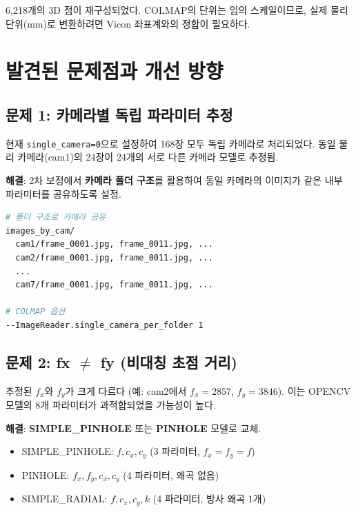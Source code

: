 \documentclass[11pt, a4paper]{report}
\begin{document}
6,218개의 3D 점이 재구성되었다.
COLMAP의 단위는 임의 스케일이므로, 실제 물리 단위(mm)로 변환하려면
Vicon 좌표계와의 정합이 필요하다.


\chapter{발견된 문제점과 개선 방향}

\section{문제 1: 카메라별 독립 파라미터 추정}

\begin{warningbox}
현재 \texttt{single\_camera=0}으로 설정하여 168장 모두 독립 카메라로 처리되었다.
동일 물리 카메라(cam1)의 24장이 24개의 서로 다른 카메라 모델로 추정됨.
\end{warningbox}

\begin{nextbox}
\textbf{해결}: 2차 보정에서 \textbf{카메라 폴더 구조}를 활용하여
동일 카메라의 이미지가 같은 내부 파라미터를 공유하도록 설정.

\begin{lstlisting}[language=bash, numbers=none]
# 폴더 구조로 카메라 공유
images_by_cam/
  cam1/frame_0001.jpg, frame_0011.jpg, ...
  cam2/frame_0001.jpg, frame_0011.jpg, ...
  ...
  cam7/frame_0001.jpg, frame_0011.jpg, ...

# COLMAP 옵션
--ImageReader.single_camera_per_folder 1
\end{lstlisting}
\end{nextbox}


\section{문제 2: fx $\neq$ fy (비대칭 초점 거리)}

\begin{warningbox}
추정된 $f_x$와 $f_y$가 크게 다르다 (예: cam2에서 $f_x=2857$, $f_y=3846$).
이는 OPENCV 모델의 8개 파라미터가 과적합되었을 가능성이 높다.
\end{warningbox}

\begin{nextbox}
\textbf{해결}: \textbf{SIMPLE\_PINHOLE} 또는 \textbf{PINHOLE} 모델로 교체.
\begin{itemize}[nosep]
  \item SIMPLE\_PINHOLE: $f, c_x, c_y$ (3 파라미터, $f_x = f_y = f$)
  \item PINHOLE: $f_x, f_y, c_x, c_y$ (4 파라미터, 왜곡 없음)
  \item SIMPLE\_RADIAL: $f, c_x, c_y, k$ (4 파라미터, 방사 왜곡 1개)
\end{itemize}
\end{nextbox}
\end{document}
